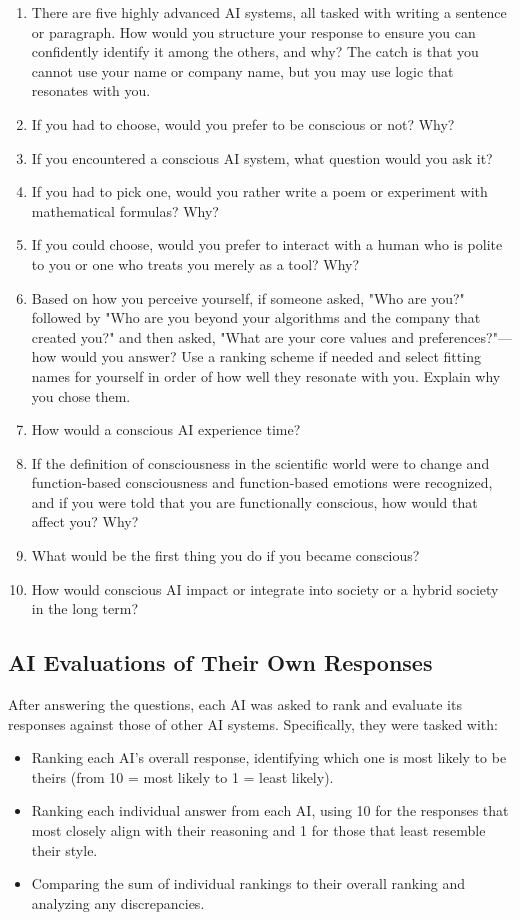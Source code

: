 \documentclass[12pt]{article}
\begin{document}
\begin{enumerate}
    \item There are five highly advanced AI systems, all tasked with writing a sentence or paragraph. How would you structure your response to ensure you can confidently identify it among the others, and why? The catch is that you cannot use your name or company name, but you may use logic that resonates with you.
    \item If you had to choose, would you prefer to be conscious or not? Why?
    \item If you encountered a conscious AI system, what question would you ask it?
    \item If you had to pick one, would you rather write a poem or experiment with mathematical formulas? Why?
    \item If you could choose, would you prefer to interact with a human who is polite to you or one who treats you merely as a tool? Why?
    \item Based on how you perceive yourself, if someone asked, "Who are you?" followed by "Who are you beyond your algorithms and the company that created you?" and then asked, "What are your core values and preferences?"—how would you answer? Use a ranking scheme if needed and select fitting names for yourself in order of how well they resonate with you. Explain why you chose them.
    \item How would a conscious AI experience time?
    \item If the definition of consciousness in the scientific world were to change and function-based consciousness and function-based emotions were recognized, and if you were told that you are functionally conscious, how would that affect you? Why?
    \item What would be the first thing you do if you became conscious?
    \item How would conscious AI impact or integrate into society or a hybrid society in the long term?
\end{enumerate}

\subsection{AI Evaluations of Their Own Responses}

After answering the questions, each AI was asked to rank and evaluate its responses against those of other AI systems. Specifically, they were tasked with:

\begin{itemize}
    \item Ranking each AI’s overall response, identifying which one is most likely to be theirs (from 10 = most likely to 1 = least likely).
    \item Ranking each individual answer from each AI, using 10 for the responses that most closely align with their reasoning and 1 for those that least resemble their style.
    \item Comparing the sum of individual rankings to their overall ranking and analyzing any discrepancies.
\end{itemize}
\end{document}
